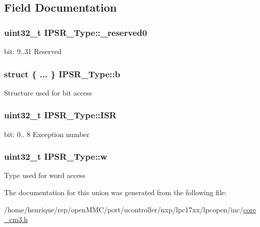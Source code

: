 \subsection{Field Documentation}
\hypertarget{unionIPSR__Type_ad2eb0a06de4f03f58874a727716aa9aa}{
\subsubsection[{\-\_\-reserved0}]{\setlength{\rightskip}{0pt plus 5cm}uint32\-\_\-t I\-P\-S\-R\-\_\-\-Type\-::\-\_\-reserved0}}\label{unionIPSR__Type_ad2eb0a06de4f03f58874a727716aa9aa}
bit\-: 9..31 Reserved \hypertarget{unionIPSR__Type_a2006d2ca6e88ca91ae1156fd750587de}{
\subsubsection[{b}]{\setlength{\rightskip}{0pt plus 5cm}struct \{ ... \}   I\-P\-S\-R\-\_\-\-Type\-::b}}\label{unionIPSR__Type_a2006d2ca6e88ca91ae1156fd750587de}
Structure used for bit access \hypertarget{unionIPSR__Type_ab46e5f1b2f4d17cfb9aca4fffcbb2fa5}{
\subsubsection[{I\-S\-R}]{\setlength{\rightskip}{0pt plus 5cm}uint32\-\_\-t I\-P\-S\-R\-\_\-\-Type\-::\-I\-S\-R}}\label{unionIPSR__Type_ab46e5f1b2f4d17cfb9aca4fffcbb2fa5}
bit\-: 0.. 8 Exception number \hypertarget{unionIPSR__Type_a4adca999d3a0bc1ae682d73ea7cfa879}{
\subsubsection[{w}]{\setlength{\rightskip}{0pt plus 5cm}uint32\-\_\-t I\-P\-S\-R\-\_\-\-Type\-::w}}\label{unionIPSR__Type_a4adca999d3a0bc1ae682d73ea7cfa879}
Type used for word access 

The documentation for this union was generated from the following file\-:\begin{DoxyCompactItemize}
\item 
/home/henrique/rep/open\-M\-M\-C/port/ucontroller/nxp/lpc17xx/lpcopen/inc/\hyperlink{core__cm3_8h}{core\-\_\-cm3.\-h}\end{DoxyCompactItemize}
